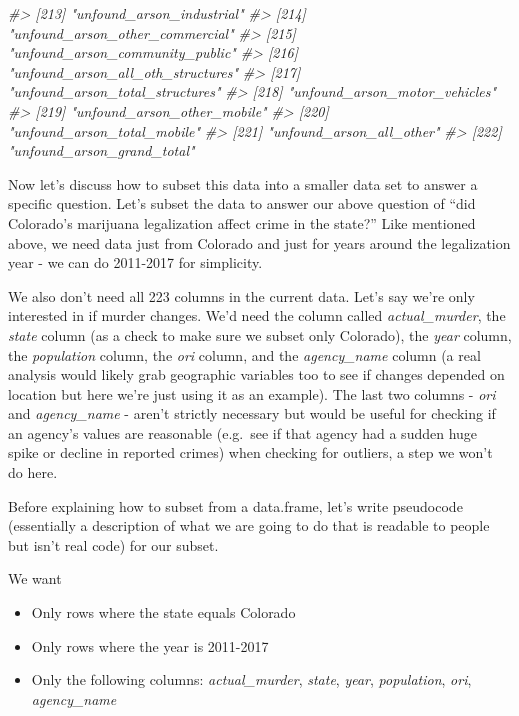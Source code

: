 \documentclass[
]{krantz}
\makeatletter
\newenvironment{Shaded}{\begin{snugshade}}{\end{snugshade}}
\newcommand{\CommentTok}[1]{\textcolor[rgb]{0.37,0.37,0.37}{\textit{#1}}}
\providecommand{\tightlist}{%
  \setlength{\itemsep}{0pt}\setlength{\parskip}{0pt}}
\newenvironment{kframe}{%
\medskip{}
\setlength{\fboxsep}{.8em}
 \def\at@end@of@kframe{}%
 \ifinner\ifhmode%
  \def\at@end@of@kframe{\end{minipage}}%
  \begin{minipage}{\columnwidth}%
 \fi\fi%
 \def\FrameCommand##1{\hskip\@totalleftmargin \hskip-\fboxsep
 \colorbox{shadecolor}{##1}\hskip-\fboxsep
     \hskip-\linewidth \hskip-\@totalleftmargin \hskip\columnwidth}%
 \MakeFramed {\advance\hsize-\width
   \@totalleftmargin\z@ \linewidth\hsize
   \@setminipage}}%
 {\par\unskip\endMakeFramed%
 \at@end@of@kframe}
\renewenvironment{Shaded}{\begin{kframe}}{\end{kframe}}
\makeatother
\begin{document}
\begin{Shaded}
\begin{Highlighting}[]
\CommentTok{\#\textgreater{} [213] "unfound\_arson\_industrial"        }
\CommentTok{\#\textgreater{} [214] "unfound\_arson\_other\_commercial"  }
\CommentTok{\#\textgreater{} [215] "unfound\_arson\_community\_public"  }
\CommentTok{\#\textgreater{} [216] "unfound\_arson\_all\_oth\_structures"}
\CommentTok{\#\textgreater{} [217] "unfound\_arson\_total\_structures"  }
\CommentTok{\#\textgreater{} [218] "unfound\_arson\_motor\_vehicles"    }
\CommentTok{\#\textgreater{} [219] "unfound\_arson\_other\_mobile"      }
\CommentTok{\#\textgreater{} [220] "unfound\_arson\_total\_mobile"      }
\CommentTok{\#\textgreater{} [221] "unfound\_arson\_all\_other"         }
\CommentTok{\#\textgreater{} [222] "unfound\_arson\_grand\_total"}
\end{Highlighting}
\end{Shaded}

Now let's discuss how to subset this data into a smaller
data set to answer a specific question. Let's subset the
data to answer our above question of ``did Colorado's
marijuana legalization affect crime in the state?'' Like
mentioned above, we need data just from Colorado and just
for years around the legalization year - we can do 2011-2017
for simplicity.

We also don't need all 223 columns in the current data.
Let's say we're only interested in if murder changes. We'd
need the column called \emph{actual\_murder}, the
\emph{state} column (as a check to make sure we subset only
Colorado), the \emph{year} column, the \emph{population}
column, the \emph{ori} column, and the \emph{agency\_name}
column (a real analysis would likely grab geographic
variables too to see if changes depended on location but
here we're just using it as an example). The last two
columns - \emph{ori} and \emph{agency\_name} - aren't
strictly necessary but would be useful for checking if an
agency's values are reasonable (e.g.~see if that agency had
a sudden huge spike or decline in reported crimes) when
checking for outliers, a step we won't do here.

Before explaining how to subset from a data.frame, let's
write pseudocode (essentially a description of what we are
going to do that is readable to people but isn't real code)
for our subset.

We want

\begin{itemize}
\tightlist
\item
  Only rows where the state equals Colorado
\item
  Only rows where the year is 2011-2017
\item
  Only the following columns: \emph{actual\_murder},
  \emph{state}, \emph{year}, \emph{population}, \emph{ori},
  \emph{agency\_name}
\end{itemize}
\end{document}
